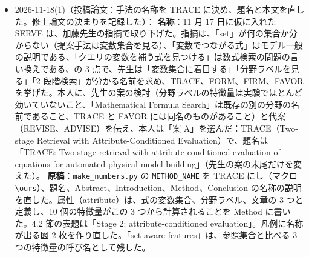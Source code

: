 \documentclass[11pt,a4paper]{jsarticle}
\begin{document}
\begin{itemize}[nosep]
    \textbf{論文の側の変更（出力は変わらない）}：「Section~\textbackslash ref」44 か所を \texttt{\textbackslash secref} に置き換え、論文と修論の両方が使うマクロを \texttt{paper/cace/macros.tex} に分けた。序論の「this paper」を「this study」にした。論文は 76 ページのままで、PDF の大きさも変わらない。
    \textbf{分かったこと}：\texttt{arydshln} を読み込むと、複数ページにわたる \texttt{longtable} で、柱の章名が前の章のままになる（最小の文書で再現し、パッケージを 1 つずつ外して確かめた）。破線の罫線はどの表も使っていないので、読み込むのをやめた。文献一覧では、\texttt{\textbackslash href} が未定義だと、文献一覧の前置きが \texttt{url} パッケージの \texttt{\textbackslash path} を上書きして DOI の下線でエラーになるので、\texttt{\textbackslash href} を定義した。
    \textbf{点検}：\texttt{thesis/master\_thesis/check\_thesis.py}（単体テスト 7 件）が、本文のページ数（結論の終わりに置いたラベルのページ番号）が 40 以下であること、解決していない参照と引用がないこと、論文の本文の節を同じ順にすべて読み込んでいることを調べる。
    \textbf{結果}：修論は全 102 ページ。本文は 31 ページ（上限 40）、文献 4 ページ、付録 A〜K。\texttt{latexmk} は exit 0 で、警告もはみ出しもない。旧い章のファイル 8 個は消した（commit \texttt{858d2af} までの履歴に残る）。旧い修論にあって今の修論にないものは、拡張ケースの説明と、主な表の括弧の値（別の出典の同じ式も正解とみなした値）である。修論の題名と表紙は変えていない。
    \textbf{確認}：論文の点検は合格。全テストは 869 passed、3 skipped、1 failed（\texttt{tests/test\_fig\_overview.py}。この作業と関係のない、前からの失敗）。
  \item 2026-11-18(1)（投稿論文：手法の名称を TRACE に決め、題名と本文を直した。修士論文の決まりを記録した）：
    \textbf{名称}：11 月 17 日に仮に入れた SERVE は、加藤先生の指摘で取り下げた。指摘は、「set」が何の集合か分からない（提案手法は変数集合を見る）、「変数でつながる式」はモデル一般の説明である、「クエリの変数を補う式を見つける」は数式検索の問題の言い換えである、の 3 点で、先生は「変数集合に着目する」「分野ラベルを見る」「2 段階検索」が分かる名前を求め、TRACE、FORM、FIRM、FAVOR を挙げた。本人に、先生の案の検討（分野ラベルの特徴量は実験でほとんど効いていないこと、「Mathematical Formula Search」は既存の別の分野の名前であること、TRACE と FAVOR には同名のものがあること）と代案（REVISE、ADVISE）を伝え、本人は「案 A」を選んだ：TRACE（Two-stage Retrieval with Attribute-Conditioned Evaluation）で、題名は「TRACE: Two-stage retrieval with attribute-conditioned evaluation of equations for automated physical model building」（先生の案の末尾だけを変えた）。
    \textbf{原稿}：\texttt{make\_numbers.py} の \texttt{METHOD\_NAME} を TRACE にし（マクロ \texttt{\textbackslash ours}）、題名、Abstract、Introduction、Method、Conclusion の名称の説明を直した。属性（attribute）は、式の変数集合、分野ラベル、文章の 3 つと定義し、10 個の特徴量がこの 3 つから計算されることを Method に書いた。4.2 節の表題は「Stage 2: attribute-conditioned evaluation」。凡例に名称が出る図 2 枚を作り直した。「set-aware features」は、参照集合と比べる 3 つの特徴量の呼び名として残した。

\end{itemize}
\end{document}
